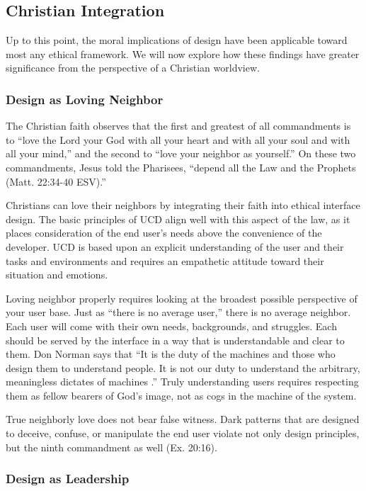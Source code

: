 \documentclass[12pt, oneside]{article}
\begin{document}
\subsection{Christian Integration}

Up to this point, the moral implications of design have been applicable toward most any ethical framework. We will now explore how these findings have greater significance from the perspective of a Christian worldview.

\subsubsection{Design as Loving Neighbor}

The Christian faith observes that the first and greatest of all commandments is to ``love the Lord your God with all your heart and with all your soul and with all your mind,'' and the second to ``love your neighbor as yourself.'' On these two commandments, Jesus told the Pharisees, ``depend all the Law and the Prophets (Matt. 22:34-40 ESV).''

Christians can love their neighbors by integrating their faith into ethical interface design. The basic principles of UCD align well with this aspect of the law, as it places consideration of the end user's needs above the convenience of the developer. UCD is based upon an explicit understanding of the user and their tasks and environments and requires an empathetic attitude toward their situation and emotions.

Loving neighbor properly requires looking at the broadest possible perspective of your user base. Just as ``there is no average user,'' there is no average neighbor. Each user will come with their own needs, backgrounds, and struggles. Each should be served by the interface in a way that is understandable and clear to them. Don Norman says that ``It is the duty of the machines and those who design them to understand people. It is not our duty to understand the arbitrary, meaningless dictates of machines \cite[p.~6]{norman_2013}.'' Truly understanding users requires respecting them as fellow bearers of God's image, not as cogs in the machine of the system.

True neighborly love does not bear false witness. Dark patterns that are designed to deceive, confuse, or manipulate the end user violate not only design principles, but the ninth commandment as well (Ex. 20:16).

\subsubsection{Design as Leadership}
\end{document}
